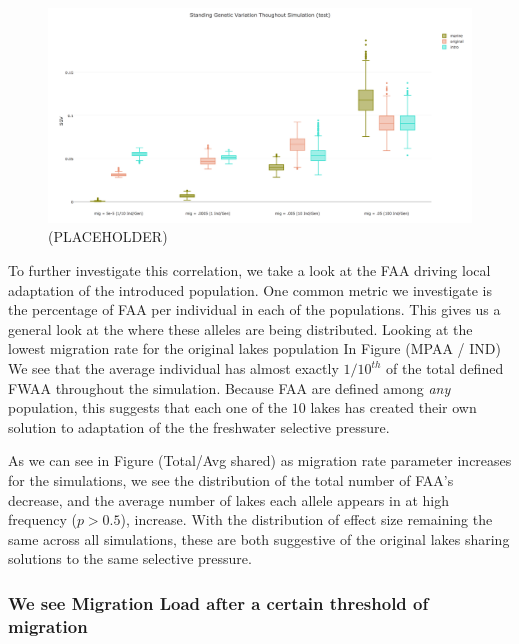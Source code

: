 \documentclass{article}
\begin{document}
\begin{figure}
	\begin{center}
  		\includegraphics[width=\linewidth]{plotlyPlots/StandingGeneticVariation.png}
  		\caption{(PLACEHOLDER)}
		\label{fig:SGV}
	\end{center}
\end{figure}



To further investigate this correlation, we take a look at the FAA driving 
local adaptation of the introduced population. 
One common metric we investigate is the percentage of FAA per individual in each of the populations. 
This gives us a general look at the where these alleles are being distributed. 
Looking at the lowest migration rate for the original lakes population In Figure (MPAA / IND) 
We see that the average individual has almost exactly $1/10^{th}$ of the total defined FWAA throughout the simulation. 
Because FAA are defined among \textit{any} population, this suggests that each one of the $10$ 
lakes has created their own solution to adaptation of the the freshwater selective pressure. 

As we can see in Figure (Total/Avg shared)
as migration rate parameter increases for the simulations, 
we see the distribution of the total number of FAA's decrease, and 
the average number of lakes each allele appears in at high frequency ($p > 0.5$), increase.
With the distribution of effect size remaining the same across all simulations, 
these are both suggestive of the original lakes sharing solutions to the same selective pressure.



\subsubsection*{We see Migration Load after a certain threshold of migration}
\end{document}
